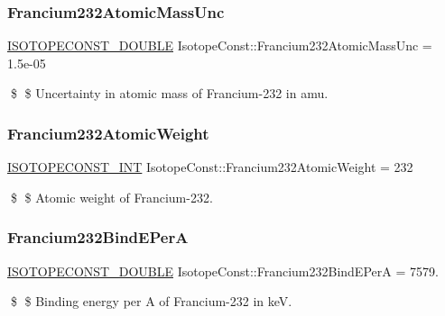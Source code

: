 \subsubsection{\texorpdfstring{Francium232\+Atomic\+Mass\+Unc}{Francium232AtomicMassUnc}}
{\footnotesize\ttfamily \mbox{\hyperlink{group___isotope_const-_macros_ga8f45a7272ce02c0b4c65c44636ed719a}{I\+S\+O\+T\+O\+P\+E\+C\+O\+N\+S\+T\+\_\+\+D\+O\+U\+B\+LE}} Isotope\+Const\+::\+Francium232\+Atomic\+Mass\+Unc = 1.\+5e-\/05}

\$ \$ Uncertainty in atomic mass of Francium-\/232 in amu. \mbox{\label{group___isotope_const-_francium-_fr232_ga077cf8f504b7ef36e258f7067a1f12e3}} 
\subsubsection{\texorpdfstring{Francium232\+Atomic\+Weight}{Francium232AtomicWeight}}
{\footnotesize\ttfamily \mbox{\hyperlink{group___isotope_const-_macros_ga5f18360b3e99483a35c32d789e62621c}{I\+S\+O\+T\+O\+P\+E\+C\+O\+N\+S\+T\+\_\+\+I\+NT}} Isotope\+Const\+::\+Francium232\+Atomic\+Weight = 232}

\$ \$ Atomic weight of Francium-\/232. \mbox{\label{group___isotope_const-_francium-_fr232_ga75e8dca4adc741fee34f79203ad5a585}} 
\subsubsection{\texorpdfstring{Francium232\+Bind\+E\+PerA}{Francium232BindEPerA}}
{\footnotesize\ttfamily \mbox{\hyperlink{group___isotope_const-_macros_ga8f45a7272ce02c0b4c65c44636ed719a}{I\+S\+O\+T\+O\+P\+E\+C\+O\+N\+S\+T\+\_\+\+D\+O\+U\+B\+LE}} Isotope\+Const\+::\+Francium232\+Bind\+E\+PerA = 7579.}

\$ \$ Binding energy per A of Francium-\/232 in keV. \mbox{\label{group___isotope_const-_francium-_fr232_gab1cbd77abdbd51b53bbff6f0607d6698}} 
